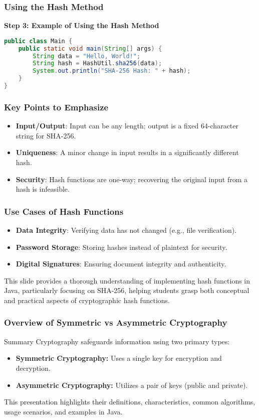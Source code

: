 \documentclass{beamer}
\begin{document}
\begin{frame}[fragile]
    \frametitle{Using the Hash Method}
    \textbf{Step 3: Example of Using the Hash Method}
    \begin{lstlisting}[language=Java]
public class Main {
    public static void main(String[] args) {
        String data = "Hello, World!";
        String hash = HashUtil.sha256(data);
        System.out.println("SHA-256 Hash: " + hash);
    }
}
    \end{lstlisting}
\end{frame}

\begin{frame}
    \frametitle{Key Points to Emphasize}
    \begin{itemize}
        \item \textbf{Input/Output}: Input can be any length; output is a fixed 64-character string for SHA-256.
        \item \textbf{Uniqueness}: A minor change in input results in a significantly different hash.
        \item \textbf{Security}: Hash functions are one-way; recovering the original input from a hash is infeasible.
    \end{itemize}
\end{frame}

\begin{frame}
    \frametitle{Use Cases of Hash Functions}
    \begin{itemize}
        \item \textbf{Data Integrity}: Verifying data has not changed (e.g., file verification).
        \item \textbf{Password Storage}: Storing hashes instead of plaintext for security.
        \item \textbf{Digital Signatures}: Ensuring document integrity and authenticity.
    \end{itemize}
    This slide provides a thorough understanding of implementing hash functions in Java, particularly focusing on SHA-256, helping students grasp both conceptual and practical aspects of cryptographic hash functions.
\end{frame}

\begin{frame}[fragile]
    \frametitle{Overview of Symmetric vs Asymmetric Cryptography}
    \begin{block}{Summary}
        Cryptography safeguards information using two primary types:
        \begin{itemize}
            \item \textbf{Symmetric Cryptography:} Uses a single key for encryption and decryption.
            \item \textbf{Asymmetric Cryptography:} Utilizes a pair of keys (public and private).
        \end{itemize}
        This presentation highlights their definitions, characteristics, common algorithms, usage scenarios, and examples in Java.
    \end{block}
\end{frame}
\end{document}
